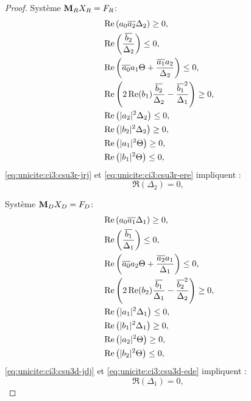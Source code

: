 \begin{proof}
    \begin{minipage}{0.49\textwidth}
      {Système \(\mathbf{M}_RX_R=F_R\)}:
      \begin{align}
        \label{eq:unicite:ci3:csu3r-j2}&\operatorname{Re}\left(a_0{\overline{a_2}}\Delta_2\right) \ge 0, \\
        \label{eq:unicite:ci3:csu3r-e2}&\operatorname{Re}\left(\dfrac{{\overline{b_2}}}{\Delta_2}\right) \le 0, \\
        \label{eq:unicite:ci3:csu3r-jdj}&\operatorname{Re}\left({\overline{a_0}}a_1\Theta + \dfrac{{\overline{a_1}}a_2}{\Delta_2} \right)\le 0,\\
        \label{eq:unicite:ci3:csu3r-ede}&\operatorname{Re}\left(2\operatorname{Re}(b_1)\dfrac{{\overline{b_2}}}{\Delta_2}-\dfrac{{\overline{b_1}}^2}{\Delta_1}\right) \ge 0,\\
        \label{eq:unicite:ci3:csu3r-jrj}&\operatorname{Re}\left(|a_2|^2\Delta_2\right) \le 0, \\
        \label{eq:unicite:ci3:csu3r-ere}&\operatorname{Re}\left(|b_2|^2\Delta_2\right) \ge 0, \\
        \label{eq:unicite:ci3:csu3r-rj2}&\operatorname{Re}\left(|a_1|^2\Theta\right)\ge 0,\\
        \label{eq:unicite:ci3:csu3r-re2}&\operatorname{Re}\left(|b_1|^2\Theta\right)\le 0,
      \end{align}
      \eqref{eq:unicite:ci3:csu3r-jrj} et \eqref{eq:unicite:ci3:csu3r-ere} impliquent :
      \begin{equation}
        \label{eq:unicite:ci3:csu3r-jre}
        \Re\left(\Delta_2\right) = 0,
      \end{equation}
    \end{minipage}
    \begin{minipage}{0.49\textwidth}
      {Système \(\mathbf{M}_DX_D=F_D\)}:
      \begin{align}
        \label{eq:unicite:ci3:csu3d-j2}&\operatorname{Re}\left(a_0{\overline{a_1}}\Delta_1\right) \ge 0, \\
        \label{eq:unicite:ci3:csu3d-e2}&\operatorname{Re}\left(\dfrac{{\overline{b_1}}}{\Delta_1}\right) \le 0, \\
        \label{eq:unicite:ci3:csu3d-jrj}&\operatorname{Re}\left({\overline{a_0}}a_2\Theta + \dfrac{{\overline{a_2}}a_1}{\Delta_1} \right)\le 0,\\
        \label{eq:unicite:ci3:csu3d-ere}&\operatorname{Re}\left(2\operatorname{Re}(b_2)\dfrac{{\overline{b_1}}}{\Delta_1}-\dfrac{{\overline{b_2}}^2}{\Delta_2}\right) \ge 0,\\
        \label{eq:unicite:ci3:csu3d-jdj}&\operatorname{Re}\left(|a_1|^2\Delta_1\right) \le 0, \\
        \label{eq:unicite:ci3:csu3d-ede}&\operatorname{Re}\left(|b_1|^2\Delta_1\right) \ge 0, \\
        \label{eq:unicite:ci3:csu3d-dj2}&\operatorname{Re}\left(|a_2|^2\Theta\right)\ge 0,\\
        \label{eq:unicite:ci3:csu3d-de2}&\operatorname{Re}\left(|b_2|^2\Theta\right)\le 0,
      \end{align}
      \eqref{eq:unicite:ci3:csu3d-jdj} et \eqref{eq:unicite:ci3:csu3d-ede} impliquent :
      \begin{equation}
        \label{eq:unicite:ci3:csu3d-jde}
        \Re\left(\Delta_1\right) = 0,
      \end{equation}
    \end{minipage}


\end{proof}
